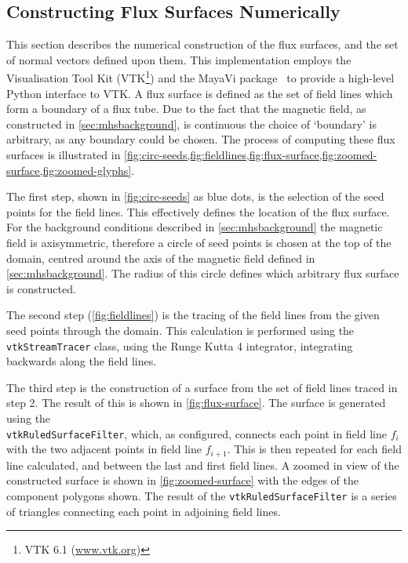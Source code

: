 \documentclass[a4paper,12pt,fourier,authoryear,custommargin]{Classes/PhDThesisPSnPDF}
\begin{document}
\subsection{Constructing Flux Surfaces Numerically}

This section describes the numerical construction of the flux surfaces, and the set of normal vectors defined upon them.
This implementation employs the Visualisation Tool Kit (VTK\footnote{VTK 6.1 (\url{www.vtk.org})}) and the MayaVi package~\citep{ramachandran2011} to provide a high-level Python interface to VTK.
A flux surface is defined as the set of field lines which form a boundary of a flux tube.
Due to the fact that the magnetic field, as constructed in \cref{sec:mhsbackground}, is continuous the choice of `boundary' is arbitrary, as any boundary could be chosen.
The process of computing these flux surfaces is illustrated in \cref{fig:circ-seeds,fig:fieldlines,fig:flux-surface,fig:zoomed-surface,fig:zoomed-glyphs}.

The first step, shown in \cref{fig:circ-seeds} as blue dots, is the selection of the seed points for the field lines.
This effectively defines the location of the flux surface.
For the background conditions described in \cref{sec:mhsbackground} the magnetic field is axisymmetric, therefore a circle of seed points is chosen at the top of the domain, centred around the axis of the magnetic field defined in \cref{sec:mhsbackground}.
The radius of this circle defines which arbitrary flux surface is constructed.

The second step (\cref{fig:fieldlines}) is the tracing of the field lines from the given seed points through the domain.
This calculation is performed using the \verb|vtkStreamTracer| class, using the Runge Kutta 4 integrator, integrating backwards along the field lines.

The third step is the construction of a surface from the set of field lines traced in step 2.
The result of this is shown in \cref{fig:flux-surface}.
The surface is generated using the \\ \verb|vtkRuledSurfaceFilter|, which, as configured, connects each point in field line $f_i$ with the two adjacent points in field line $f_{i+1}$.
This is then repeated for each field line calculated, and between the last and first field lines.
A zoomed in view of the constructed surface is shown in \cref{fig:zoomed-surface} with the edges of the component polygons shown.
The result of the \verb|vtkRuledSurfaceFilter| is a series of triangles connecting each point in adjoining field lines.
\end{document}
